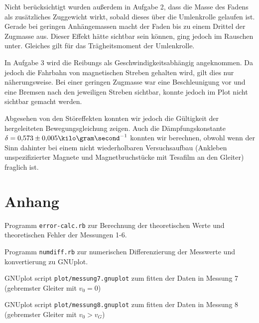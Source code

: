 \documentclass[a4paper,german,12pt,smallheadings]{scrartcl}
\begin{document}
Nicht berücksichtigt wurden außerdem in Aufgabe 2, dass die Masse des Fadens
als zusätzliches Zuggewicht wirkt, sobald dieses über die Umlenkrolle gelaufen
ist. Gerade bei geringen Anhängemassen macht der Faden bis zu einem Drittel der
Zugmasse aus. Dieser Effekt hätte sichtbar sein können, ging jedoch im Rauschen
unter. Gleiches gilt für das Trägheitsmoment der Umlenkrolle.

In Aufgabe 3 wird die Reibungs als Geschwindigkeitsabhängig angeknommen. Da
jedoch die Fahrbahn von magnetischen Streben gehalten wird, gilt dies nur
näherungsweise. Bei einer geringen Zugmasse war eine Beschleunigung vor und
eine Bremsen nach den jeweiligen Streben sichtbar, konnte jedoch im Plot nicht
sichtbar gemacht werden.

Abgesehen von den Störeffekten konnten wir jedoch die Gültigkeit der
hergeleiteten Bewegungsgleichung zeigen. Auch die Dämpfungskonstante $\delta =
0{,}573\pm0{,}005 \kilo\gram\second^{-1}$ konnten wir berechnen, obwohl wenn
der Sinn dahinter bei einem nicht wiederholbaren Versuchsaufbau (Ankleben
unspezifizierter Magnete und Magnetbruchstücke mit Tesafilm an den Gleiter)
fraglich ist.

\newpage
\begin{landscape}
  
\end{landscape}

\newpage
\begin{landscape}
  
\end{landscape}

\newpage
\section*{Anhang}
\lstset{basicstyle=\footnotesize\ttfamily,breaklines=true}
\lstset{numbers=left, frame=single}

Programm \texttt{error-calc.rb} zur Berechnung der theoretischen Werte und
theoretischen Fehler der Messungen 1-6.



Programm \texttt{numdiff.rb} zur numerischen Differenzierung der Messwerte und
konvertierung zu GNUplot.


GNUplot script \texttt{plot/messung7.gnuplot} zum fitten der Daten in Messung 7
(gebremster Gleiter mit $v_0 = 0$)


GNUplot script \texttt{plot/messung8.gnuplot} zum fitten der Daten in Messung 8
(gebremster Gleiter mit $v_0 > v_G$)

\end{document}
